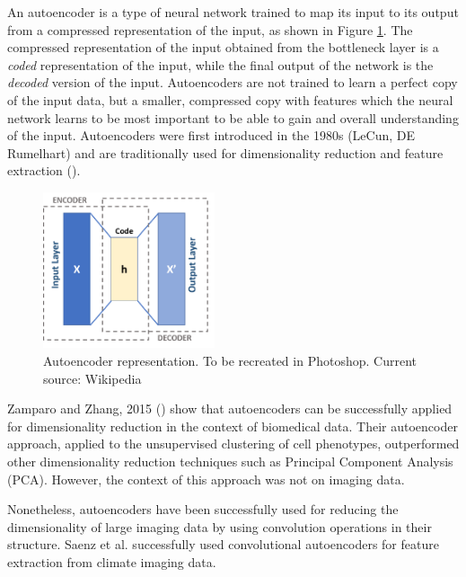 An autoencoder is a type of neural network trained to map its input to its output from a compressed representation of the input, as shown in Figure \ref{fig:autoencoder}. The compressed representation of the input obtained from the bottleneck layer is a \textit{coded} representation of the input, while the final output of the network is the \textit{decoded} version of the input. Autoencoders are not trained to learn a perfect copy of the input data, but a smaller, compressed copy with features which the neural network learns to be most important to be able to gain and overall understanding of the input. Autoencoders were first introduced in the 1980s (LeCun, DE Rumelhart) and are traditionally used for dimensionality reduction and feature extraction (\cite{http://www.deeplearningbook.org/contents/autoencoders.html}). 

\begin{figure}[h!]
    \centering
    \includegraphics[width=0.45\textwidth]{dissertation/figures/autoencoder_schema.png}
    \caption{Autoencoder representation. To be recreated in Photoshop. Current source: Wikipedia}
    \label{fig:autoencoder}
\end{figure}

Zamparo and Zhang, 2015 (\cite{https://arxiv.org/pdf/1501.01348.pdf}) show that autoencoders can be successfully applied for dimensionality reduction in the context of biomedical data. Their autoencoder approach, applied to the unsupervised clustering of cell phenotypes, outperformed other dimensionality reduction techniques such as Principal Component Analysis (PCA). However, the context of this approach was not on imaging data. 

Nonetheless, autoencoders have been successfully used for reducing the dimensionality of large imaging data by using convolution operations in their structure. Saenz et al. successfully used convolutional autoencoders for feature extraction from climate imaging data. %

